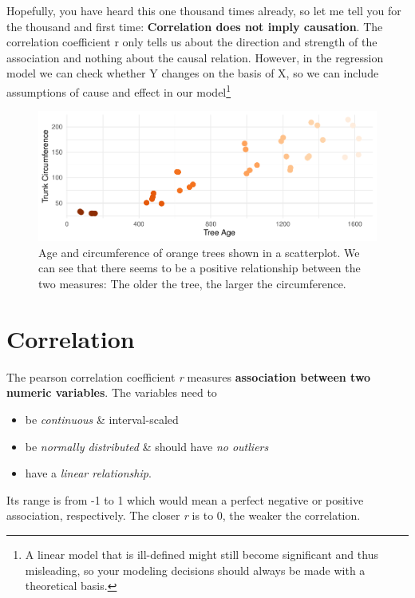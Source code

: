 \documentclass[
]{book}
\providecommand{\tightlist}{%
  \setlength{\itemsep}{0pt}\setlength{\parskip}{0pt}}
\begin{document}
Hopefully, you have heard this one thousand times already, so let me tell you for the thousand and first time: \textbf{Correlation does not imply causation}.
The correlation coefficient r only tells us about the direction and strength of the association and nothing about the causal relation.
However, in the regression model we can check whether Y changes on the basis of X, so we can include assumptions of cause and effect in our model\footnote{A linear model that is ill-defined might still become significant and thus misleading, so your modeling decisions should always be made with a theoretical basis.}

\begin{figure}
\centering
\includegraphics{_main_files/figure-html/tree-age-1.pdf}
\caption{\label{fig:tree-age}Age and circumference of orange trees shown in a scatterplot. We can see that there seems to be a positive relationship between the two measures: The older the tree, the larger the circumference.}
\end{figure}

\section{Correlation}\label{correlation}

The pearson correlation coefficient \emph{r} measures \textbf{association between two numeric variables}.
The variables need to

\begin{itemize}
\tightlist
\item
  be \emph{continuous} \& interval-scaled
\item
  be \emph{normally distributed} \& should have \emph{no outliers}
\item
  have a \emph{linear relationship}.
\end{itemize}

Its range is from -1 to 1 which would mean a perfect negative or positive association, respectively.
The closer \emph{r} is to 0, the weaker the correlation.
\end{document}

